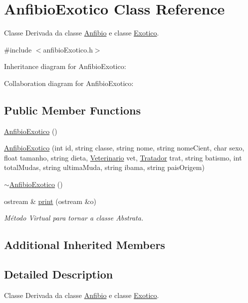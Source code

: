 \hypertarget{classAnfibioExotico}{}\section{Anfibio\+Exotico Class Reference}
\label{classAnfibioExotico}


Classe Derivada da classe \hyperlink{classAnfibio}{Anfibio} e classe \hyperlink{classExotico}{Exotico}.  




{\ttfamily \#include $<$anfibio\+Exotico.\+h$>$}



Inheritance diagram for Anfibio\+Exotico\+:


Collaboration diagram for Anfibio\+Exotico\+:
\subsection*{Public Member Functions}
\begin{DoxyCompactItemize}
\item 
\hyperlink{classAnfibioExotico_a6f62d4cbdc244038c3b108a7fbfb818d}{Anfibio\+Exotico} ()
\item 
\hyperlink{classAnfibioExotico_a378d1627185cdc38fe544107a383c212}{Anfibio\+Exotico} (int id, string classe, string nome, string nome\+Cient, char sexo, float tamanho, string dieta, \hyperlink{classVeterinario}{Veterinario} vet, \hyperlink{classTratador}{Tratador} trat, string batismo, int total\+Mudas, string ultima\+Muda, string ibama, string pais\+Origem)
\item 
\hyperlink{classAnfibioExotico_a2615151a98a1713a0d8c65d97bccd813}{$\sim$\+Anfibio\+Exotico} ()
\item 
ostream \& \hyperlink{classAnfibioExotico_ac5d435b804cb80f3a6c3a476ed9c6990}{print} (ostream \&o)
\begin{DoxyCompactList}\small\item\em Método Virtual para tornar a classe Abstrata. \end{DoxyCompactList}\end{DoxyCompactItemize}
\subsection*{Additional Inherited Members}


\subsection{Detailed Description}
Classe Derivada da classe \hyperlink{classAnfibio}{Anfibio} e classe \hyperlink{classExotico}{Exotico}. 


